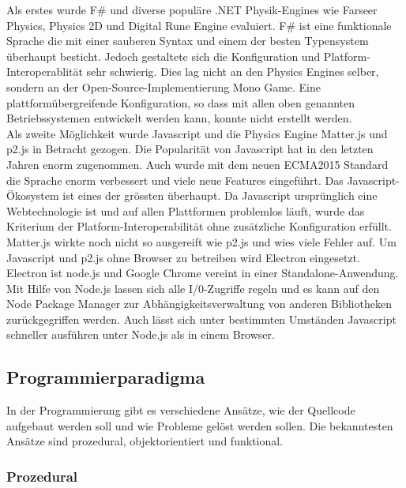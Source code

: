     Als erstes wurde F\# und diverse populäre .NET Physik-Engines wie Farseer Physics,
    Physics 2D und Digital Rune Engine evaluiert.
    F\# ist eine funktionale Sprache die mit einer sauberen Syntax und einem der besten Typensystem überhaupt besticht.
    Jedoch gestaltete sich die Konfiguration und Platform-Interoperablität sehr schwierig.
    Dies lag nicht an den Physics Engines selber, sondern an der Open-Source-Implementierung Mono Game.
    Eine plattformübergreifende Konfiguration,
    so dass mit allen oben genannten Betriebssystemen entwickelt werden kann,
    konnte nicht erstellt werden.
    \\
    Als zweite Möglichkeit wurde Javascript und die Physics Engine Matter.js und p2.js in Betracht gezogen.
    Die Popularität von Javascript hat in den letzten Jahren enorm zugenommen.
    Auch wurde mit dem neuen ECMA2015 Standard die Sprache enorm verbessert und viele neue Features eingeführt.
    Das Javascript-Ökosystem ist eines der grössten überhaupt.
    Da Javascript ursprünglich eine Webtechnologie ist und auf allen Plattformen problemlos läuft,
    wurde das Kriterium der Platform-Interoperabilität ohne zusätzliche Konfiguration erfüllt.
    Matter.js wirkte noch nicht so ausgereift wie p2.js und wies viele Fehler auf.
    Um Javascript und p2.js ohne Browser zu betreiben wird Electron eingesetzt.
    Electron ist node.js und Google Chrome vereint in einer Standalone-Anwendung.
    Mit Hilfe von Node.js lassen sich alle I/0-Zugriffe regeln und es kann auf den
    Node Package Manager zur Abhängigkeitsverwaltung von anderen Bibliotheken zurückgegriffen werden.
    Auch lässt sich unter bestimmten Umständen Javascript schneller ausführen unter Node.js als in einem Browser.

    \subsection{Programmierparadigma\label{sub:TechnologyParadigma}}

      In der Programmierung gibt es verschiedene Ansätze,
      wie der Quellcode aufgebaut werden soll und wie Probleme gelöst werden sollen.
      Die bekanntesten Ansätze sind prozedural, objektorientiert und funktional.

      \subsubsection{Prozedural\label{subsub:TechnologyParadigmaProzedural}}

